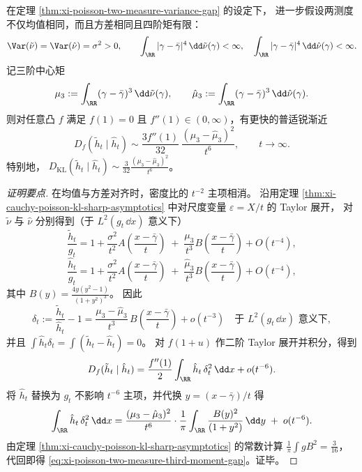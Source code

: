 \begin{corollary}\label{cor:xi-poisson-two-measure-third-moment-gap}
在定理 \ref{thm:xi-poisson-two-measure-variance-gap} 的设定下，
进一步假设两测度不仅均值相同，而且方差相同且四阶矩有限：
\[
\Var(\tilde\nu)=\Var(\hat\nu)=\sigma^2>0,
\qquad
\int_{\RR}|\gamma-\bar\gamma|^4\,\dd\tilde\nu(\gamma)<\infty,\quad
\int_{\RR}|\gamma-\bar\gamma|^4\,\dd\hat\nu(\gamma)<\infty.
\]
记三阶中心矩
\[
\mu_3:=\int_{\RR}(\gamma-\bar\gamma)^3\,\dd\tilde\nu(\gamma),
\qquad
\hat\mu_3:=\int_{\RR}(\gamma-\bar\gamma)^3\,\dd\hat\nu(\gamma).
\]
则对任意凸 \(f\) 满足 \(f(1)=0\) 且 \(f''(1)\in(0,\infty)\)，有更快的普适锐渐近
\begin{equation}\label{eq:xi-poisson-two-measure-third-moment-gap}
\boxed{\;
D_f(\tilde h_t\mid \hat h_t)\sim \frac{3f''(1)}{32}\,\frac{(\mu_3-\hat\mu_3)^2}{t^6},
\qquad t\to\infty.\;}
\end{equation}
特别地，
\(
D_{\mathrm{KL}}(\tilde h_t\mid \hat h_t)\sim \frac{3}{32}\frac{(\mu_3-\hat\mu_3)^2}{t^6}
\)。
\end{corollary}
\begin{proof}[证明要点]
在均值与方差对齐时，密度比的 \(t^{-2}\) 主项相消。
沿用定理 \ref{thm:xi-cauchy-poisson-kl-sharp-asymptotics} 中对尺度变量 \(\varepsilon=X/t\) 的 Taylor 展开，
对 \(\tilde\nu\) 与 \(\hat\nu\) 分别得到（于 \(L^2(g_t\,\dd x)\) 意义下）
\[
\frac{\tilde h_t}{g_t}=1+\frac{\sigma^2}{t^2}A\!\left(\frac{x-\bar\gamma}{t}\right)
\;+\;\frac{\mu_3}{t^3}B\!\left(\frac{x-\bar\gamma}{t}\right)+O(t^{-4}),
\]
\[
\frac{\hat h_t}{g_t}=1+\frac{\sigma^2}{t^2}A\!\left(\frac{x-\bar\gamma}{t}\right)
\;+\;\frac{\hat\mu_3}{t^3}B\!\left(\frac{x-\bar\gamma}{t}\right)+O(t^{-4}),
\]
其中
\(
B(y)=\frac{4y(y^2-1)}{(1+y^2)^3}
\)。
因此
\[
\delta_t:=\frac{\tilde h_t}{\hat h_t}-1
=\frac{\mu_3-\hat\mu_3}{t^3}\,B\!\left(\frac{x-\bar\gamma}{t}\right)+o(t^{-3})
\quad\text{于 }L^2(g_t\,\dd x)\text{ 意义下},
\]
并且 \(\int \hat h_t\delta_t=\int(\tilde h_t-\hat h_t)=0\)。
对 \(f(1+u)\) 作二阶 Taylor 展开并积分，得到
\[
D_f(\tilde h_t\mid \hat h_t)
=\frac{f''(1)}{2}\int_{\RR}\hat h_t\,\delta_t^2\,\dd x+o(t^{-6}).
\]
将 \(\hat h_t\) 替换为 \(g_t\) 不影响 \(t^{-6}\) 主项，并代换 \(y=(x-\bar\gamma)/t\) 得
\[
\int_{\RR}\hat h_t\,\delta_t^2\,\dd x
=\frac{(\mu_3-\hat\mu_3)^2}{t^6}\cdot \frac{1}{\pi}\int_{\RR}\frac{B(y)^2}{(1+y^2)}\,\dd y
\;+\;o(t^{-6}).
\]
由定理 \ref{thm:xi-cauchy-poisson-kl-sharp-asymptotics} 的常数计算 \(\frac{1}{\pi}\int gB^2=\frac{3}{16}\)，代回即得 \eqref{eq:xi-poisson-two-measure-third-moment-gap}。证毕。
\end{proof}

